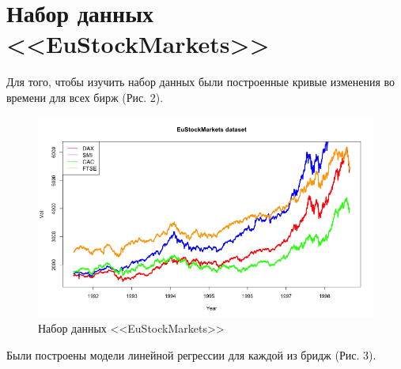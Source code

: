 \documentclass[]{article}
\numberwithin{equation}{section}
\begin{document}
    \section{Набор данных <<EuStockMarkets>>}

    Для того, чтобы изучить набор данных были построенные кривые изменения во времени для всех бирж (Рис. 2).

    \begin{figure}[H]
        \centering
        \includegraphics[width = 0.8\linewidth]{data/stcokmark_data.png}
        \vspace{-0.5cm}
        \caption{Набор данных <<EuStockMarkets>>}
    \end{figure}
    \vspace{-0.4cm}
    Были построены модели линейной регрессии для каждой из бридж (Рис. 3).
    \vspace{-0.3cm}
\end{document}
